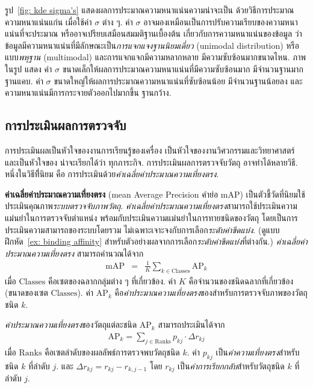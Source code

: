รูป~\ref{fig: kde sigma's}
แสดงผลการประมาณความหนาแน่นความน่าจะเป็น ด้วยวิธีการประมาณความหนาแน่นแก่น เมื่อใช้ค่า $\sigma$ ต่าง ๆ.
ค่า $\sigma$ อาจมองเหมือนเป็นการปรับความเรียบของความหนาแน่นที่จะประมาณ
หรืออาจเปรียบเสมือนสมมติฐานเบื้องต้น เกี่ยวกับการความหนาแน่นของข้อมูล
ว่าข้อมูลมีความหนาแน่นที่มีลักษณะเป็น\textit{การแจกแจงฐานนิยมเดี่ยว} (unimodal distribution)
หรือแบบ\textit{พหุฐาน} (multimodal) และการแจกแจกมีความหลากหลาย มีความซับซ้อนมากขนาดไหน.
ภาพในรูป แสดง ค่า $\sigma$ ขนาดเล็กให้ผลการประมาณความหนาแน่นที่มีความซับซ้อนมาก มีจำนวนฐานมาก ฐานแคบ.
ค่า $\sigma$ ขนาดใหญ่ให้ผลการประมาณความหนาแน่นที่ซับซ้อนน้อย มีจำนวนฐานน้อยลง
และความหนาแน่นมีการกระจายตัวออกไปมากขึ้น ฐานกว้าง.


\subsection{การประเมินผลการตรวจจับ}
\label{sec: object detection evaluation}

การประเมินผลเป็นหัวใจของงานการเรียนรู้ของเครื่อง เป็นหัวใจของงานวิศวกรรมและวิทยาศาสตร์ 
และเป็นหัวใจของ น่าจะเรียกได้ว่า ทุกภาระกิจ.
การประเมินผลการตรวจจับวัตถุ อาจทำได้หลายวิธี.
หนึ่งในวิธีทีี่นิยม คือ การประเมินด้วย\textit{ค่าเฉลี่ยค่าประมาณความเที่ยงตรง}.

\textbf{ค่าเฉลี่ยค่าประมาณความเที่ยงตรง} (mean Average Precision คำย่อ mAP) เป็นตัวชี้วัดที่นิยมใช้ประเมินคุณภาพ\textit{ระบบตรวจจับภาพวัตถุ}.
\textit{ค่าเฉลี่ยค่าประมาณความเที่ยงตรง}สามารถใช้ประเมินความแม่นยำในการตรวจจับตำแหน่ง พร้อมกับประเมินความแม่นยำในการทายชนิดของวัตถุ 
โดยเป็นการประเมินความสามารถของระบบโดยรวม ไม่เฉพาะเจาะจงกับการเลือก\textit{ระดับค่าขีดแบ่ง}.
(ดูแบบฝึกหัด~\ref{ex: binding affinity} สำหรับตัวอย่างผลจากการเลือก\textit{ระดับค่าขีดแบ่ง}ที่ต่างกัน.)
%
\textit{ค่าเฉลี่ยค่าประมาณความเที่ยงตรง} สามารถคำนวณได้จาก
%
\begin{eqnarray}
\mathrm{mAP} &=& \frac{1}{K} \sum_{k \in \mathrm{Classes}} \mathrm{AP}_k
\label{eq: mAP}
\end{eqnarray}
เมื่อ $\mathrm{Classes}$ คือเซตของฉลากกลุ่มต่าง ๆ ที่เกี่ยวข้อง.
ค่า $K$ คือจำนวนของชนิดฉลากที่เกี่ยวข้อง (ขนาดของเซต $\mathrm{Classes}$).
ค่า $\mathrm{AP}_k$ คือ\textit{ค่าประมาณความเที่ยงตรง}ของสำหรับการตรวจจับภาพของวัตถุชนิด $k$.

\textit{ค่าประมาณความเที่ยงตรง}ของวัตถุแต่ละชนิด $\mathrm{AP}_k$ สามารถประเมินได้จาก
\begin{eqnarray}
\mathrm{AP}_k = \sum_{j \in \mathrm{Ranks}} p_{kj} \cdot \Delta r_{kj}
\label{eq: mAP class AP}
\end{eqnarray}
เมื่อ $\mathrm{Ranks}$ คือเซตลำดับของผลลัพธ์การตรวจพบวัตถุชนิด $k$.
ค่า $p_{kj}$ เป็น\textit{ค่าความเที่ยงตรง}สำหรับชนิด $k$ ที่ลำดับ $j$.
และ $\Delta r_{kj} = r_{kj} - r_{k,j-1}$
โดย $r_{kj}$ เป็น\textit{ค่าการเรียกกลับ}สำหรับวัตถุชนิด $k$ ที่ลำดับ $j$.

